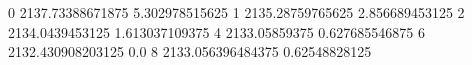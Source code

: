 0 2137.73388671875 5.302978515625
1 2135.28759765625 2.856689453125
2 2134.0439453125 1.613037109375
4 2133.05859375 0.627685546875
6 2132.430908203125 0.0
8 2133.056396484375 0.62548828125
